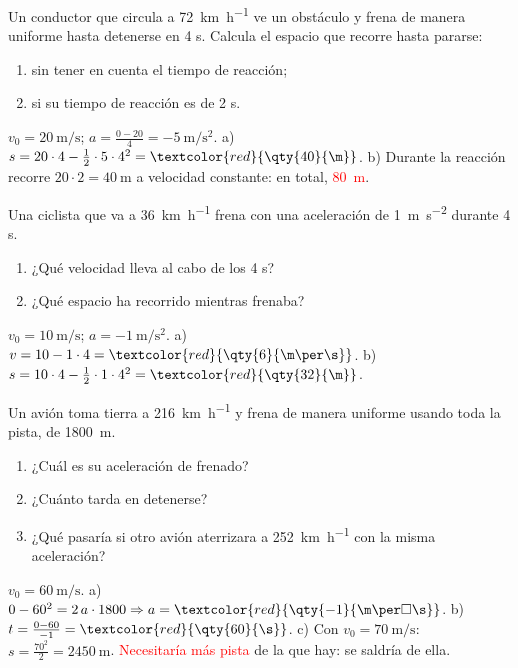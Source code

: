 \begin{exercise}
    Un conductor que circula a \qty{72}{\km\per\hour} ve un obstáculo y frena de manera uniforme hasta detenerse en 4 s. Calcula el espacio que recorre hasta pararse:
    \begin{enumerate}[label=\alph*)]
        \item sin tener en cuenta el tiempo de reacción;
        \item si su tiempo de reacción es de 2 s.
    \end{enumerate}
    \begin{solu}
        \(v_0 = \qty{20}{\m\per\s}\); \(a = \frac{0 - 20}{4} = \qty{-5}{\m\per\square\s}\).
        a) \(s = 20 \cdot 4 - \frac{1}{2} \cdot 5 \cdot 4^2 = \textcolor{red}{\qty{40}{\m}}\).
        b) Durante la reacción recorre \(20 \cdot 2 = \qty{40}{\m}\) a velocidad constante: en total, \textcolor{red}{\qty{80}{\m}}.
    \end{solu}
\end{exercise}

\begin{exercise}
    Una ciclista que va a \qty{36}{\km\per\hour} frena con una aceleración de \qty{1}{\m\per\square\s} durante 4 s.
    \begin{enumerate}[label=\alph*)]
        \item ¿Qué velocidad lleva al cabo de los 4 s?
        \item ¿Qué espacio ha recorrido mientras frenaba?
    \end{enumerate}
    \begin{solu}
        \(v_0 = \qty{10}{\m\per\s}\); \(a = \qty{-1}{\m\per\square\s}\).
        a) \(v = 10 - 1 \cdot 4 = \textcolor{red}{\qty{6}{\m\per\s}}\). b) \(s = 10 \cdot 4 - \frac{1}{2} \cdot 1 \cdot 4^2 = \textcolor{red}{\qty{32}{\m}}\).
    \end{solu}
\end{exercise}

\begin{exercise}
    Un avión toma tierra a \qty{216}{\km\per\hour} y frena de manera uniforme usando toda la pista, de \qty{1800}{\m}.
    \begin{enumerate}[label=\alph*)]
        \item ¿Cuál es su aceleración de frenado?
        \item ¿Cuánto tarda en detenerse?
        \item ¿Qué pasaría si otro avión aterrizara a \qty{252}{\km\per\hour} con la misma aceleración?
    \end{enumerate}
    \begin{solu}
        \(v_0 = \qty{60}{\m\per\s}\).
        a) \(0 - 60^2 = 2\,a \cdot 1800 \Rightarrow a = \textcolor{red}{\qty{-1}{\m\per\square\s}}\).
        b) \(t = \frac{0 - 60}{-1} = \textcolor{red}{\qty{60}{\s}}\).
        c) Con \(v_0 = \qty{70}{\m\per\s}\): \(s = \frac{70^2}{2} = \qty{2450}{\m}\). \textcolor{red}{Necesitaría más pista} de la que hay: se saldría de ella.
    \end{solu}
\end{exercise}

